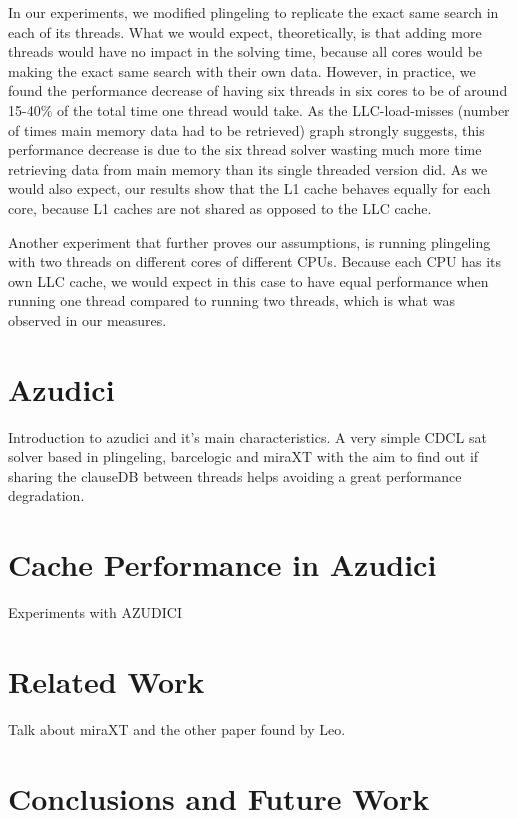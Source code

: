 \documentclass{llncs}
\begin{document}
In our experiments, we modified plingeling to replicate the exact same search in each of its threads. What we would expect, theoretically, is that adding more threads would have no impact in the solving time, because all cores would be making the exact same search with their own data. However, in practice, we found the performance decrease of having six threads in six cores to be of around 15-40\% of the total time one thread would take. As the LLC-load-misses (number of times main memory data had to be retrieved) graph strongly suggests, this performance decrease is due to the six thread solver wasting much more time retrieving data from main memory than its single threaded version did. As we would also expect, our results show that the L1 cache behaves equally for each core, because L1 caches are not shared as opposed to the LLC cache.

Another experiment that further proves our assumptions, is running plingeling with two threads on different cores of different CPUs. Because each CPU has its own LLC cache, we would expect in this case to have equal performance when running one thread compared to running two threads, which is what was observed in our measures. 

\section{Azudici}
\label{sec:azudici}

Introduction to azudici and it's main characteristics. A very simple
CDCL sat solver based in plingeling, barcelogic and miraXT with the
aim to find out if sharing the clauseDB between threads helps avoiding
a great performance degradation.

\section{Cache Performance in Azudici}

Experiments with AZUDICI

\section{Related Work}

Talk about miraXT and the other paper found by Leo.

\section{Conclusions and Future Work}
\end{document}
